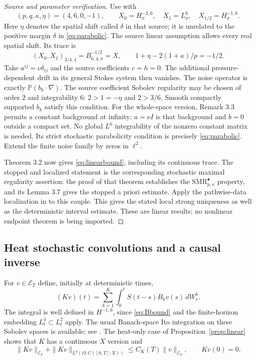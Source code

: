 \documentclass[11pt]{article}
\newcommand{\Pp}{\mathbb P}
\numberwithin{equation}{section}
\begin{document}
\begin{proof}[Source and parameter verification]
Use \cite[Assumption 3.1, Theorem 3.2 and Remark 3.3]{AV24} with
\[
 (p,q,\kappa,\eta)=(4,6,0,-1),\qquad
 X_0=H^{-2,6}_\sigma,\quad X_1=L^6_\sigma,
 \quad X_{1/2}=H^{-1,6}_\sigma.
\]
Here $\eta$ denotes the spatial shift called $\delta$ in that source;
it is unrelated to the positive margin $\delta$ in \eqref{eq:parabolic}.
The source linear assumption allows every real spatial shift. Its trace is
\[
 (X_0,X_1)_{3/4,4}=B^{-1/2}_{6,4,\sigma}=X,
 \qquad 1+\eta-2(1+\kappa)/p=-1/2.
\]
Take $a^{ij}=\nu\delta_{ij}$ and the source coefficients $c=h=0$.
The additional pressure-dependent drift in its general Stokes system then
vanishes. The noise operator is exactly $\Pp(b_k\cdot\nabla)$.
The source coefficient Sobolev regularity may be chosen of order $2$ and
integrability $6$: $2>1=-\eta$ and $2>3/6$. Smooth compactly supported
$b_k$ satisfy this condition. For the whole-space version, Remark 3.3
permits a constant background at infinity: $a=\nu I$ is that background
and $b=0$ outside a compact set. No global $L^6$ integrability of the
nonzero constant matrix is needed. Its strict stochastic parabolicity
condition is precisely \eqref{eq:parabolic}. Extend the finite noise family
by zeros in $\ell^2$.

Theorem 3.2 now gives \eqref{eq:linearbound}, including its continuous trace.
The stopped and localized statement is the corresponding stochastic maximal
regularity assertion: the proof of that theorem establishes the
$\mathrm{SMR}^{\bullet}_{p,\kappa}$ property, and its Lemma 3.7 gives the
stopped a priori estimate. Apply the pathwise-data localization in
\cite[Definitions 3.7--3.8 and Proposition 3.11]{AV25} to this couple.
This gives the stated local strong uniqueness as well as the deterministic
interval estimate. These are linear results; no nonlinear endpoint theorem
is being imported.
\end{proof}

\subsection{Heat stochastic convolutions and a causal inverse}
For $v\in\mathcal E_T$ define, initially at deterministic times,
\begin{equation}\label{eq:K}
 (Kv)(t)=\sum_{k=1}^K\int_0^tS(t-s)B_kv(s)\,dW_s^k.
\end{equation}
The integral is well defined in $H^{-1,6}$, since \eqref{eq:Bbound} and the
finite-horizon embedding $L^4_t\subset L^2_t$ apply. The usual Banach-space
Ito integration on these Sobolev spaces is available; see
\cite[Section 2.5 and Proposition 2.4]{AV25}.
The heat-only case of Proposition~\ref{prop:linear} shows that $K$ has a
continuous $X$ version and
\begin{equation}\label{eq:Kbound}
 \|Kv\|_{\mathcal E_T}+\|Kv\|_{L^4(\Omega;C([0,T];X))}
 \leq C_K(T)\|v\|_{\mathcal E_T},\qquad Kv(0)=0.
\end{equation}
\end{document}

